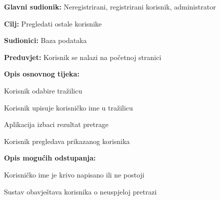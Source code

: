 				\noindent {}
					\begin{packed_item}
	
						\item \textbf{Glavni sudionik: }Neregistrirani, registrirani korisnik, administrator
						\item  \textbf{Cilj:} Pregledati ostale korisnike
						\item  \textbf{Sudionici:} Baza podataka
						\item  \textbf{Preduvjet:} Korisnik se nalazi na početnoj stranici
						\item  \textbf{Opis osnovnog tijeka:}
						
						\item[] \begin{packed_enum}
							
							\item Korisnik odabire tražilicu
							\item Korisnik upisuje korisničko ime u tražilicu
							\item Aplikacija izbaci rezultat pretrage
							\item Korisnik pregledava prikazanog korisnika

						\end{packed_enum}
						
						\item  \textbf{Opis mogućih odstupanja:}
						
						\item[] \begin{packed_item}
	
							\item[3.a] Korisničko ime je krivo napisano ili ne postoji
								\begin{packed_item}
									\item Sustav obavještava korisnika o neuspjeloj pretrazi
								\end{packed_item}
							
						\end{packed_item}					
					\end{packed_item}
					
